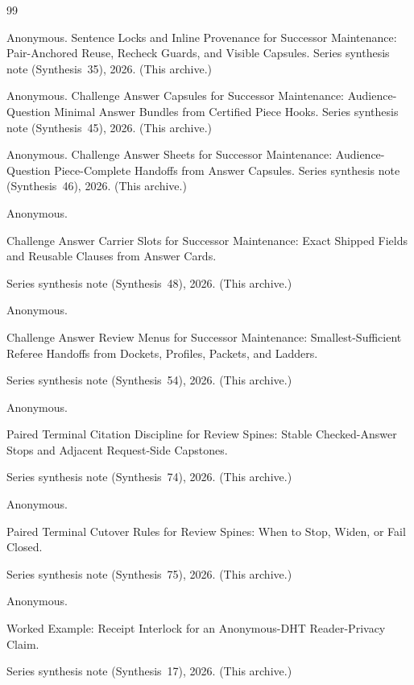 \documentclass[11pt]{article}
\begin{document}
\begin{thebibliography}{99}\small

Anonymous.
\newblock Sentence Locks and Inline Provenance for Successor Maintenance: Pair-Anchored Reuse, Recheck Guards, and Visible Capsules.
\newblock Series synthesis note (Synthesis~35), 2026. (This archive.)

Anonymous.
\newblock Challenge Answer Capsules for Successor Maintenance: Audience-Question Minimal Answer Bundles from Certified Piece Hooks.
\newblock Series synthesis note (Synthesis~45), 2026. (This archive.)

Anonymous.
\newblock Challenge Answer Sheets for Successor Maintenance: Audience-Question Piece-Complete Handoffs from Answer Capsules.
\newblock Series synthesis note (Synthesis~46), 2026. (This archive.)

Anonymous.

\newblock Challenge Answer Carrier Slots for Successor Maintenance: Exact Shipped Fields and Reusable Clauses from Answer Cards.

\newblock Series synthesis note (Synthesis~48), 2026. (This archive.)

Anonymous.

\newblock Challenge Answer Review Menus for Successor Maintenance: Smallest-Sufficient Referee Handoffs from Dockets, Profiles, Packets, and Ladders.

\newblock Series synthesis note (Synthesis~54), 2026. (This archive.)

Anonymous.

\newblock Paired Terminal Citation Discipline for Review Spines: Stable Checked-Answer Stops and Adjacent Request-Side Capstones.

\newblock Series synthesis note (Synthesis~74), 2026. (This archive.)

Anonymous.

\newblock Paired Terminal Cutover Rules for Review Spines: When to Stop, Widen, or Fail Closed.

\newblock Series synthesis note (Synthesis~75), 2026. (This archive.)

Anonymous.

\newblock Worked Example: Receipt Interlock for an Anonymous-DHT Reader-Privacy Claim.

\newblock Series synthesis note (Synthesis~17), 2026. (This archive.)

\end{thebibliography}
\end{document}
